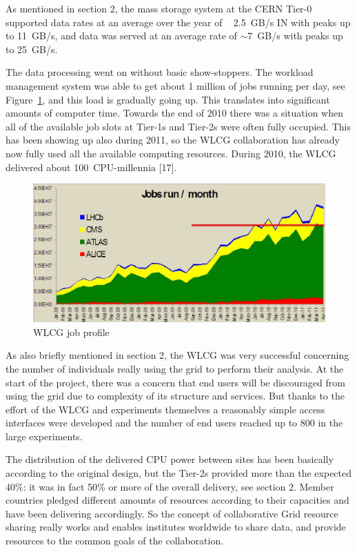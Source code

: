 \documentclass{intech}
\begin{document}
As mentioned in section 2, the mass storage system at the CERN
Tier-0 supported data rates at an average over the year of ~
2.5~GB/s IN with peaks up to 11~GB/s, and data was served at an
average rate of $\sim 7$~GB/s with peaks up to 25~GB/s.

The data processing went on without basic show-stoppers. The
workload management system was able to get about 1 million of jobs
running per day, see Figure~\ref{fig19}, and this load is
gradually going up. This translates into significant amounts of
computer time. Towards the end of 2010 there was a situation when
all of the available job slots at Tier-1s and Tier-2s were often
fully occupied. This has been showing up also during 2011, so the
WLCG collaboration has already now fully used all the available
computing resources. During 2010, the WLCG delivered about
100~CPU-millennia [17].

\begin{figure}[htb] %
\centering
\includegraphics[width=13cm]{fig19.eps} %
\caption{WLCG job profile}\label{fig19}
\end{figure}



As also briefly mentioned in section 2, the WLCG was very successful
concerning the number of individuals really using the grid to
perform their analysis. At the start of the project, there was a
concern that end users will be discouraged from using the grid due
to complexity of its structure and services. But thanks to the
effort of the WLCG and experiments themselves a reasonably simple
access interfaces were developed and the number of end users reached
up to 800 in the large experiments.

The distribution of the delivered CPU power between sites has been
basically according to the original design, but the Tier-2s provided
more than the expected 40\%: it was in fact 50\% or more of the
overall delivery, see section 2. Member countries pledged different
amounts of resources according to their capacities and have been
delivering accordingly.  So the concept of collaborative Grid
resource sharing really works and enables institutes worldwide to
share data, and provide resources to the common goals of the
collaboration.
\end{document}
